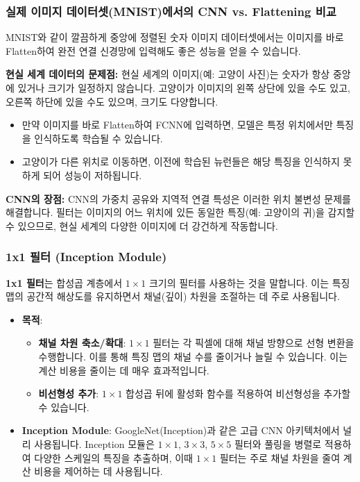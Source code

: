\documentclass[11pt,a4paper]{article}
\begin{document}
\subsubsection{실제 이미지 데이터셋(MNIST)에서의 CNN vs. Flattening 비교}
MNIST와 같이 깔끔하게 중앙에 정렬된 숫자 이미지 데이터셋에서는 이미지를 바로 Flatten하여 완전 연결 신경망에 입력해도 좋은 성능을 얻을 수 있습니다.

\begin{warningbox}
\textbf{현실 세계 데이터의 문제점:}
현실 세계의 이미지(예: 고양이 사진)는 숫자가 항상 중앙에 있거나 크기가 일정하지 않습니다. 고양이가 이미지의 왼쪽 상단에 있을 수도 있고, 오른쪽 하단에 있을 수도 있으며, 크기도 다양합니다.
\begin{itemize}
    \item 만약 이미지를 바로 Flatten하여 FCNN에 입력하면, 모델은 특정 위치에서만 특징을 인식하도록 학습될 수 있습니다.
    \item 고양이가 다른 위치로 이동하면, 이전에 학습된 뉴런들은 해당 특징을 인식하지 못하게 되어 성능이 저하됩니다.
\end{itemize}
\textbf{CNN의 장점:}
CNN의 가중치 공유와 지역적 연결 특성은 이러한 위치 불변성 문제를 해결합니다. 필터는 이미지의 어느 위치에 있든 동일한 특징(예: 고양이의 귀)을 감지할 수 있으므로, 현실 세계의 다양한 이미지에 더 강건하게 작동합니다.
\end{warningbox}

\subsubsection{1x1 필터 (Inception Module)}
\begin{conceptbox}
\textbf{1x1 필터}는 합성곱 계층에서 $1 \times 1$ 크기의 필터를 사용하는 것을 말합니다. 이는 특징 맵의 공간적 해상도를 유지하면서 채널(깊이) 차원을 조절하는 데 주로 사용됩니다.
\end{conceptbox}
\begin{itemize}
    \item \textbf{목적}:
        \begin{itemize}
            \item \textbf{채널 차원 축소/확대}: $1 \times 1$ 필터는 각 픽셀에 대해 채널 방향으로 선형 변환을 수행합니다. 이를 통해 특징 맵의 채널 수를 줄이거나 늘릴 수 있습니다. 이는 계산 비용을 줄이는 데 매우 효과적입니다.
            \item \textbf{비선형성 추가}: $1 \times 1$ 합성곱 뒤에 활성화 함수를 적용하여 비선형성을 추가할 수 있습니다.
        \end{itemize}
    \item \textbf{Inception Module}: GoogleNet(Inception)과 같은 고급 CNN 아키텍처에서 널리 사용됩니다. Inception 모듈은 $1 \times 1$, $3 \times 3$, $5 \times 5$ 필터와 풀링을 병렬로 적용하여 다양한 스케일의 특징을 추출하며, 이때 $1 \times 1$ 필터는 주로 채널 차원을 줄여 계산 비용을 제어하는 데 사용됩니다.
\end{itemize}
\end{document}
